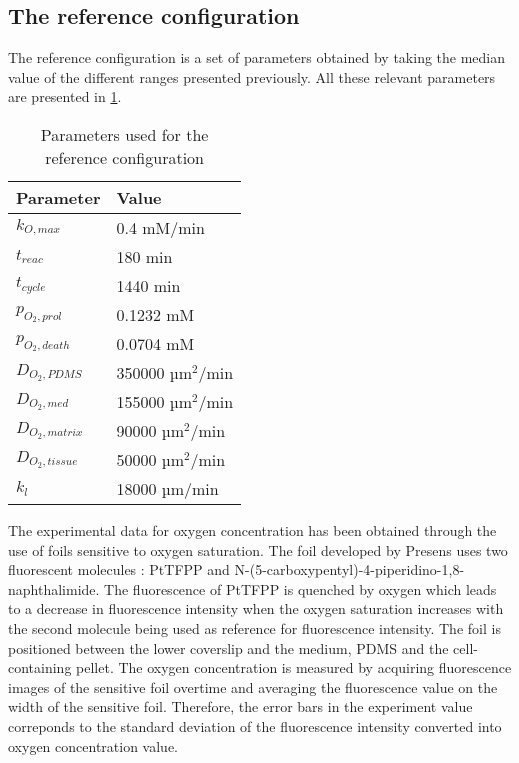 \documentclass[11pt,a4paper]{article}
\begin{document}
\subsection{The reference configuration}
The reference configuration is a set of parameters obtained by taking the median value of the different ranges presented previously. All these relevant parameters are presented in \ref{tab:1}.

\begin{table}
\begin{center}
\begin{tabular}{ |p{25mm}|p{30mm}| }
\hline
 \textbf{Parameter}  & \textbf{Value} \\
 \hline
  \hline
 $k_{O,max}$ & 0.4 mM/min\\
  \hline
 $t_{reac}$ & 180 min \\ 
  \hline
   $t_{cycle}$ & 1440 min  \\
 \hline 
 $p_{O_2,prol}$ & 0.1232 mM \\
  \hline
 $p_{O_2,death}$ & 0.0704 mM \\
 \hline
 $D_{O_2,PDMS}$ & 350000 µm$^2$/min \\
 \hline 
  $D_{O_2,med}$ & 155000 µm$^2$/min \\
 \hline 
  $D_{O_2,matrix}$ & 90000 µm$^2$/min \\
 \hline
  $D_{O_2,tissue}$ & 50000 µm$^2$/min \\
    \hline
  $k_{l}$ & 18000 µm/min  \\
 \hline 
\end{tabular}
\caption{Parameters used for the reference configuration  \label{tab:1}}
\end{center}
\end{table}

The experimental data for oxygen concentration has been obtained through the use of foils sensitive to oxygen saturation. The foil developed by Presens uses two fluorescent molecules : PtTFPP and N-(5-carboxypentyl)-4-piperidino-1,8-naphthalimide. The fluorescence of PtTFPP is quenched by oxygen which leads to a decrease in fluorescence intensity when the oxygen saturation increases with the second molecule being used as reference for fluorescence intensity. The foil is positioned between the lower coverslip and the medium, PDMS and the cell-containing pellet. The oxygen concentration is measured by acquiring fluorescence images of the sensitive foil overtime and averaging the fluorescence value on the width of the sensitive foil. Therefore, the error bars in the experiment value correponds to the standard deviation of the fluorescence intensity converted into oxygen concentration value. %
\end{document}
